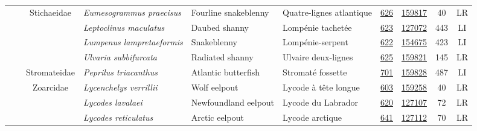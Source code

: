 \documentclass[12pt]{article}\usepackage[]{graphicx}\usepackage[]{color}
\begin{document}
\begin{landscapepage}
\begin{longtable}[t]{ccc>{\centering\arraybackslash}p{3cm}>{\centering\arraybackslash}p{3cm}>{\centering\arraybackslash}p{3cm}>{}c>{}ccc}
\hspace{1em}\hspace{1em} &  & Stichaeidae & \em{Eumesogrammus praecisus} & Fourline snakeblenny & Quatre-lignes atlantique & \href{#sec:30}{626} & \href{http://www.marinespecies.org/aphia.php?p=taxdetails&id=127138}{159817} & 40 & LR\\
\hspace{1em}\hspace{1em} &  &  & \em{Leptoclinus maculatus} & Daubed shanny & Lompénie tachetée & \href{#sec:31}{623} & \href{http://www.marinespecies.org/aphia.php?p=taxdetails&id=127144}{127072} & 443 & LI\\
\hspace{1em}\hspace{1em} &  &  & \em{Lumpenus lampretaeformis} & Snakeblenny & Lompénie-serpent & \href{#sec:40}{622} & \href{http://www.marinespecies.org/aphia.php?p=taxdetails&id=127137}{154675} & 423 & LI\\
\hspace{1em}\hspace{1em} &  &  & \em{Ulvaria subbifurcata} & Radiated shanny & Ulvaire deux-lignes & \href{#sec:41}{625} & \href{http://www.marinespecies.org/aphia.php?p=taxdetails&id=127136}{159821} & 145 & LR\\
\hspace{1em}\hspace{1em} &  & Stromateidae & \em{Peprilus triacanthus} & Atlantic butterfish & Stromaté fossette & \href{#sec:42}{701} & \href{http://www.marinespecies.org/aphia.php?p=taxdetails&id=158879}{159828} & 487 & LI\\
\hspace{1em}\hspace{1em} &  & Zoarcidae & \em{Lycenchelys verrillii} & Wolf eelpout & Lycode à tête longue & \href{#sec:43}{603} & \href{http://www.marinespecies.org/aphia.php?p=taxdetails&id=158885}{159258} & 40 & LR\\
\hspace{1em}\hspace{1em} &  &  & \em{Lycodes lavalaei} & Newfoundland eelpout & Lycode du Labrador & \href{#sec:44}{620} & \href{http://www.marinespecies.org/aphia.php?p=taxdetails&id=158791}{127107} & 72 & LR\\
\hspace{1em}\hspace{1em} &  &  & \em{Lycodes reticulatus} & Arctic eelpout & Lycode arctique & \href{#sec:142}{641} & \href{http://www.marinespecies.org/aphia.php?p=taxdetails&id=158833}{127112} & 70 & LR\\

\end{longtable}
\end{landscapepage}
\end{document}
